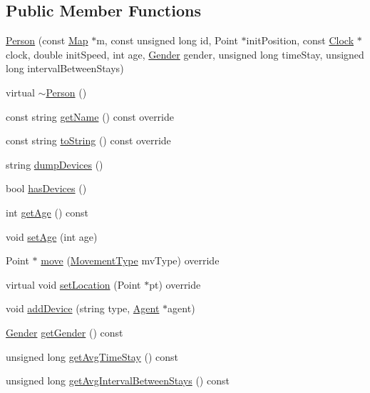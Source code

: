 \subsection*{Public Member Functions}
\begin{DoxyCompactItemize}
\item 
\mbox{\hyperlink{class_person_a1fb64d7ef7c528d01dd09b2099b00e38}{Person}} (const \mbox{\hyperlink{class_map}{Map}} $\ast$m, const unsigned long id, Point $\ast$init\+Position, const \mbox{\hyperlink{class_clock}{Clock}} $\ast$clock, double init\+Speed, int age, \mbox{\hyperlink{class_person_aff84ca16bd4dbf364614d86f20b29dd2}{Gender}} gender, unsigned long time\+Stay, unsigned long interval\+Between\+Stays)
\item 
virtual \mbox{\hyperlink{class_person_a6b5729bb56531c93312b1179c8ee4b71}{$\sim$\+Person}} ()
\item 
const string \mbox{\hyperlink{class_person_aa2a6f8d7f1d94045a03ca578f2ed272c}{get\+Name}} () const override
\item 
const string \mbox{\hyperlink{class_person_a68872538da519d0a04297f43376db27c}{to\+String}} () const override
\item 
string \mbox{\hyperlink{class_person_a0bc06f77b3e8a151f8c5cc77459895c9}{dump\+Devices}} ()
\item 
bool \mbox{\hyperlink{class_person_a40d6f2c716dd3c9794067817a3fb9165}{has\+Devices}} ()
\item 
int \mbox{\hyperlink{class_person_a4b66dbee570398920b8fb6aacddd2559}{get\+Age}} () const
\item 
void \mbox{\hyperlink{class_person_ac8ade54c27a0657c987c395ff04a9d46}{set\+Age}} (int age)
\item 
Point $\ast$ \mbox{\hyperlink{class_person_a89843e85f14abc08422273c20252ae23}{move}} (\mbox{\hyperlink{_movement_type_8h_a8a93b61bc797a7d1907f42796a252493}{Movement\+Type}} mv\+Type) override
\item 
virtual void \mbox{\hyperlink{class_person_a05f4ac2107d59e03f0f336eda08aa358}{set\+Location}} (Point $\ast$pt) override
\item 
void \mbox{\hyperlink{class_person_a3ce0a72a98c2e723e48dcd7b4d9af599}{add\+Device}} (string type, \mbox{\hyperlink{class_agent}{Agent}} $\ast$agent)
\item 
\mbox{\hyperlink{class_person_aff84ca16bd4dbf364614d86f20b29dd2}{Gender}} \mbox{\hyperlink{class_person_adb5a4fabaaa6bf851de701aeb9df4fdf}{get\+Gender}} () const
\item 
unsigned long \mbox{\hyperlink{class_person_a2b01d9997db6f6d4555dbc5ac9898077}{get\+Avg\+Time\+Stay}} () const
\item 
unsigned long \mbox{\hyperlink{class_person_a59d3ea8e10928537043ee7b3d24a470c}{get\+Avg\+Interval\+Between\+Stays}} () const
\end{DoxyCompactItemize}
